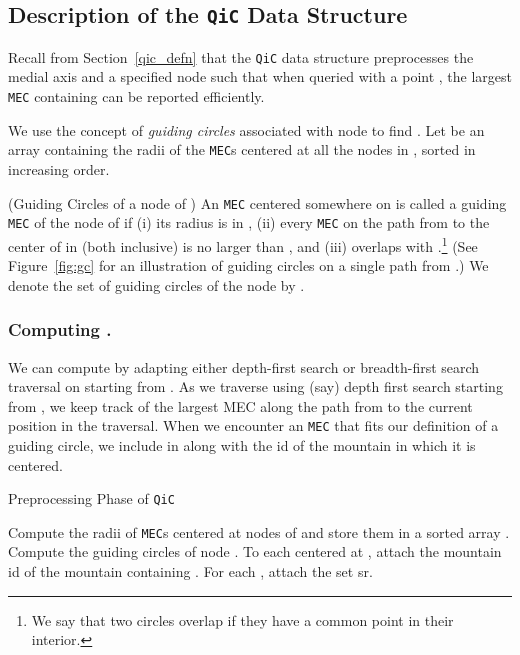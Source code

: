 \documentclass[12pt]{llncs}
\begin{document}
\vspace{-0.15in}
\subsection{Description of the {\tt QiC} Data Structure}\label{subsec:QiC}
Recall from Section\ \ref{qic_defn} that  the {\tt QiC} data structure preprocesses  the 
medial axis and a specified node  such that when queried with a point , the largest {\tt MEC} containing  can be reported efficiently.  

We use the concept of {\it guiding circles} associated with node  to find .
Let  be an array containing the radii of the {\tt MEC}s centered at all the 
nodes 
in , sorted in increasing order.



\begin{definition} (Guiding Circles of a node  of ) \label{def1}
An {\tt MEC}  centered somewhere on  is called a guiding {\tt MEC} of the 
node 
 of  if (i) its radius is in , (ii) every {\tt MEC}  on the path from 
 to the center of  in  (both inclusive) is no larger than , and (iii)  
overlaps with .\footnote{We say that two circles overlap if they have a 
common point in their interior.} (See Figure\ \ref{fig:gc} for an illustration of guiding 
circles on a single path from .) We denote the set of guiding circles of the node  by .
\end{definition}
\vspace{-0.2in}
\subsubsection{Computing .} \label{GC}
We can compute  by adapting  either depth-first search 
or breadth-first search 
traversal on  starting from . As we traverse  using (say) depth first search 
starting from , we keep track of the largest MEC along the path from  to the 
current position in the traversal. When we encounter an {\tt MEC}   that fits our 
definition of a guiding circle, we include  in  along with the id of the 
mountain in which it is centered. 


\begin{algorithm}[h!]
\caption{Preprocessing Phase of {\tt QiC}}
\label{alg:QiCPrep}
\begin{algorithmic}[1]
\STATE Compute the radii of {\tt MEC}s centered at nodes of  and store them in a sorted array .
\STATE Compute the guiding circles  of node . 
\STATE To each  centered at , attach  the mountain id of the mountain containing .
\STATE For each , attach the set sr. 
\end{algorithmic}
\end{algorithm}
\end{document}
